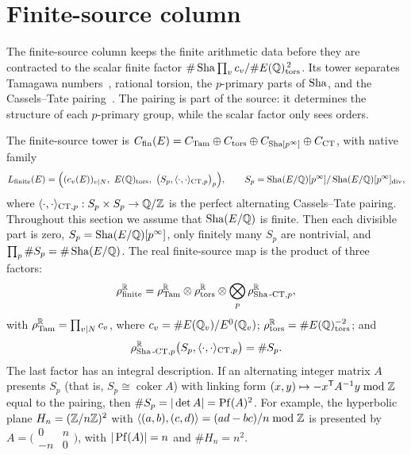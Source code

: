 \section{Finite-source column}
\label{sec:finite-source}

The finite-source column keeps the finite arithmetic data before they are
contracted to the scalar finite factor
$\#\operatorname{Sha}\prod_vc_v/\#E(\mathbb{Q})_{\operatorname{tors}}^{\,2}$.  Its tower separates Tamagawa
numbers~\citep{Silverman1994}, rational torsion, the $p$-primary parts of
$\operatorname{Sha}$, and the Cassels--Tate pairing~\citep{Cassels1962,PoonenStoll1999}.
The pairing is part of the source: it determines the structure of each
$p$-primary group, while the scalar factor only sees orders.

\begin{definition}\label{def:apparatus:finite-source-map}
The finite-source tower is
$C_{\mathrm{fin}}(E)=C_{\mathrm{Tam}}\oplus C_{\operatorname{tors}}\oplus
C_{\operatorname{Sha}[p^\infty]}\oplus C_{\mathrm{CT}}$, with native family
\[
  L_{\mathrm{finite}}(E)
  =
  \Bigl((c_v(E))_{v\mid N},\ E(\mathbb{Q})_{\operatorname{tors}},\
  \bigl(S_p,\langle\cdot,\cdot\rangle_{\mathrm{CT},p}\bigr)_p\Bigr),
  \qquad
  S_p=\operatorname{Sha}(E/\mathbb{Q})[p^\infty]/\operatorname{Sha}(E/\mathbb{Q})[p^\infty]_{\mathrm{div}},
\]
where $\langle\cdot,\cdot\rangle_{\mathrm{CT},p}:S_p\times S_p\to\mathbb{Q}/\mathbb{Z}$ is the
perfect alternating Cassels--Tate pairing.  Throughout this section we
assume that $\operatorname{Sha}(E/\mathbb{Q})$ is finite.  Then each divisible part is zero,
$S_p=\operatorname{Sha}(E/\mathbb{Q})[p^\infty]$, only finitely many $S_p$ are nontrivial, and
$\prod_p\#S_p=\#\operatorname{Sha}(E/\mathbb{Q})$.  The real finite-source map is the product
of three factors:
\[
  \rho_{\mathrm{finite}}^{\mathbb{R}}
  =
  \rho_{\mathrm{Tam}}^{\mathbb{R}}
  \otimes
  \rho_{\operatorname{tors}}^{\mathbb{R}}
  \otimes
  \bigotimes_p \rho_{\operatorname{Sha}\text{-}\mathrm{CT},p}^{\mathbb{R}},
\]
with $\rho_{\mathrm{Tam}}^{\mathbb{R}}=\prod_{v\mid N}c_v$, where
$c_v=\#E(\mathbb{Q}_v)/E^0(\mathbb{Q}_v)$; $\rho_{\operatorname{tors}}^{\mathbb{R}}=\#E(\mathbb{Q})_{\operatorname{tors}}^{-2}$; and
\[
  \rho_{\operatorname{Sha}\text{-}\mathrm{CT},p}^{\mathbb{R}}\bigl(S_p,\langle\cdot,\cdot\rangle_{\mathrm{CT},p}\bigr)=\#S_p .
\]
The last factor has an integral description.  If an alternating integer
matrix $A$ presents $S_p$ (that is, $S_p\cong\operatorname{coker}A$) with
linking form $(x,y)\mapsto -x^{\mathsf T}A^{-1}y \bmod \mathbb{Z}$ equal to the
pairing, then $\#S_p=|\det A|=\operatorname{Pf}(A)^2$.  For example, the hyperbolic
plane $H_n=(\mathbb{Z}/n\mathbb{Z})^2$ with
$\langle(a,b),(c,d)\rangle=(ad-bc)/n \bmod \mathbb{Z}$ is presented by
$A=\bigl(\begin{smallmatrix}0&n\\-n&0\end{smallmatrix}\bigr)$, with
$|\operatorname{Pf}(A)|=n$ and $\#H_n=n^2$.
\end{definition}


